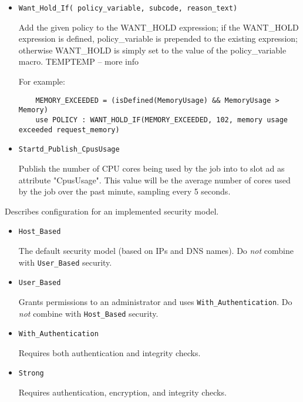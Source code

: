 \begin{description}
\begin{itemize}
	\item \texttt{Want\_Hold\_If( policy\_variable, subcode, reason\_text)}

	Add the given policy to the WANT\_HOLD expression; if the WANT\_HOLD
	expression is defined, policy\_variable is prepended to the existing
	expression; otherwise WANT\_HOLD is simply set to the value of
	the policy\_variable macro.
	TEMPTEMP -- more info

	For example:

    \begin{verbatim}
	MEMORY_EXCEEDED = (isDefined(MemoryUsage) && MemoryUsage > Memory)
	use POLICY : WANT_HOLD_IF(MEMORY_EXCEEDED, 102, memory usage exceeded request_memory)
    \end{verbatim}

	\item \texttt{Startd\_Publish\_CpusUsage}

	Publish the number of CPU cores being used by the job into
	to slot ad as attribute "CpusUsage". This value will
	be the average number of cores used by the job over the
	past minute, sampling every 5 seconds.
  \end{itemize}

\label{usecategory:SECURITY}
\item[\MacroNI{SECURITY category}]
  Describes configuration for an implemented security model.
  \begin{itemize}
    \item \texttt{Host\_Based}

    The default security model (based on IPs and DNS names).
    Do \emph{not} combine with \texttt{User\_Based} security.

    \item \texttt{User\_Based}

    Grants permissions to an administrator and uses 
    \texttt{With\_Authentication}.
    Do \emph{not} combine with \texttt{Host\_Based} security.

    \item \texttt{With\_Authentication}

    Requires both authentication and integrity checks.

    \item \texttt{Strong}

    Requires authentication, encryption, and integrity checks.
  \end{itemize}

\end{description}

